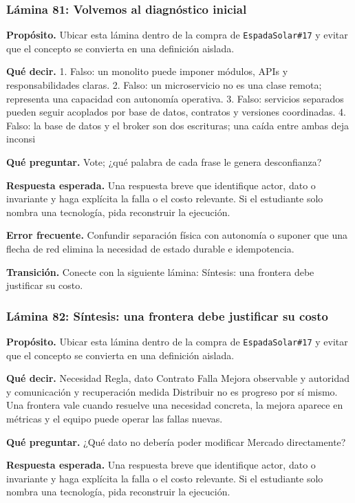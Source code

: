 \documentclass[variant=docente,cover=institutional,mode=screen]{ua-engineering-v6-article}
\begin{document}
\subsubsection*{Lámina 81: Volvemos al diagnóstico inicial}
\textbf{Propósito.} Ubicar esta lámina dentro de la compra de \texttt{EspadaSolar\#17} y evitar que el concepto se convierta en una definición aislada.

\textbf{Qué decir.} 1. Falso: un monolito puede imponer módulos, APIs y responsabilidades claras. 2. Falso: un microservicio no es una clase remota; representa una capacidad con autonomía operativa. 3. Falso: servicios separados pueden seguir acoplados por base de datos, contratos y versiones coordinadas. 4. Falso: la base de datos y el broker son dos escrituras; una caída entre ambas deja inconsi

\textbf{Qué preguntar.} Vote; ¿qué palabra de cada frase le genera desconfianza?

\textbf{Respuesta esperada.} Una respuesta breve que identifique actor, dato o invariante y haga explícita la falla o el costo relevante. Si el estudiante solo nombra una tecnología, pida reconstruir la ejecución.

\textbf{Error frecuente.} Confundir separación física con autonomía o suponer que una flecha de red elimina la necesidad de estado durable e idempotencia.

\textbf{Transición.} Conecte con la siguiente lámina: Síntesis: una frontera debe justificar su costo.

\subsubsection*{Lámina 82: Síntesis: una frontera debe justificar su costo}
\textbf{Propósito.} Ubicar esta lámina dentro de la compra de \texttt{EspadaSolar\#17} y evitar que el concepto se convierta en una definición aislada.

\textbf{Qué decir.} Necesidad Regla, dato Contrato Falla Mejora observable y autoridad y comunicación y recuperación medida Distribuir no es progreso por sí mismo. Una frontera vale cuando resuelve una necesidad concreta, la mejora aparece en métricas y el equipo puede operar las fallas nuevas.

\textbf{Qué preguntar.} ¿Qué dato no debería poder modificar Mercado directamente?

\textbf{Respuesta esperada.} Una respuesta breve que identifique actor, dato o invariante y haga explícita la falla o el costo relevante. Si el estudiante solo nombra una tecnología, pida reconstruir la ejecución.
\end{document}
